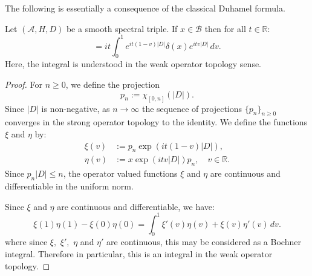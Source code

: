     The following is essentially a consequence of the classical Duhamel formula.
    \begin{lem}\label{exp commutator lemma} 
        Let $(\mathcal{A},H,D)$ be a smooth spectral triple. If $x\in\mathcal{B}$ then for all $t \in \mathbb{R}$:
        \begin{equation*}
            [e^{it|D|},x] = it\int_0^1 e^{it(1-v)|D|}\delta(x)e^{itv|D|}\,dv.
        \end{equation*}
        Here, the integral is understood in the weak operator topology sense.
    \end{lem}
    \begin{proof}
        For $n \geq 0$, we define the projection
        \begin{equation*}
            p_n := \chi_{[0,n]}(|D|).
        \end{equation*}
        Since $|D|$ is non-negative, as $n\to\infty$ the sequence of projections $\{p_n\}_{n\geq 0}$ converges in the strong operator topology to the identity.
        We define the functions $\xi$ and $\eta$ by:
        \begin{align*}
             \xi(v) &:= p_n\exp(it(1-v)|D|),\\
            \eta(v) &:= x\exp(itv|D|)p_n, \quad v \in \mathbb{R}.
        \end{align*}
        Since $p_n|D| \leq n$, the operator valued functions $\xi$ and $\eta$ are continuous and differentiable in the uniform norm. 
        
        Since $\xi$ and $\eta$ are continuous and differentiable, we have:
        \begin{equation*}
            \xi(1)\eta(1)-\xi(0)\eta(0) = \int_0^1 \xi'(v)\eta(v)+\xi(v)\eta'(v)\,dv.
        \end{equation*}
        where since $\xi,$ $\xi',$ $\eta$ and $\eta'$ are continuous, this may be considered as a Bochner integral. Therefore in particular,
        this is an integral in the weak operator topology.
        

\end{proof}
